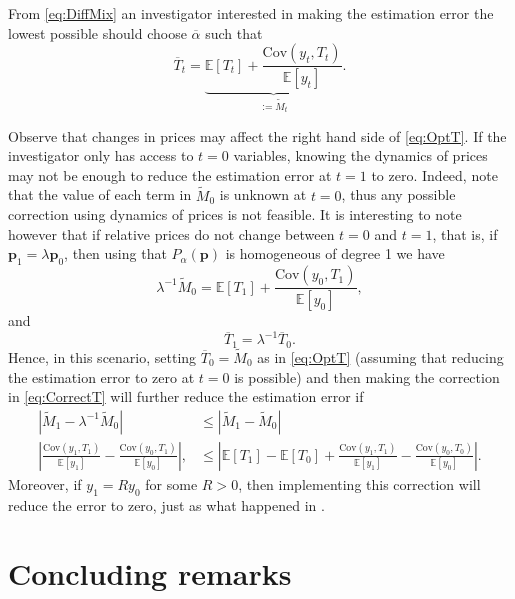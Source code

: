 \documentclass[english, a4paper,12pt]{article}
\begin{document}
From \eqref{eq:DiffMix} an investigator interested in making the estimation error the lowest possible should choose $\overline{\alpha}$ such that
	\begin{equation} \label{eq:OptT}
		\overline{T}_{t} =  \underbrace{\mathbb{E}\left[T_{t} \right] + \frac{\mathrm{Cov}\left(y_{t}, T_{t} \right)}{\mathbb{E}[y_{t}]}}_{:= \tilde{M}_{t}}.
	\end{equation}

Observe that changes in prices may affect the right hand side of \eqref{eq:OptT}. If the investigator only has access to $t =0$ variables, knowing the dynamics of prices may not be enough to reduce the estimation error at $t =1$ to zero. Indeed, note that the value of each term in $\tilde{M}_{0}$ is unknown at $t=0$, thus any possible correction using dynamics of prices is not feasible. It is interesting to note however that if relative prices do not change between $t=0$ and $t=1$, that is, if $\mathbf{p}_{1} = \lambda \mathbf{p}_{0}$, then using that $P_{\alpha}(\mathbf{p})$ is homogeneous of degree 1 we have
	$$\lambda^{-1}\tilde{M}_{0} = \mathbb{E}[T_{1}] + \frac{\mathrm{Cov}\left(y_{0}, T_{1} \right)}{\mathbb{E}[y_{0}]},$$
and
	\begin{equation} \label{eq:CorrectT}
		\overline{T}_{1} = \lambda^{-1}\overline{T}_{0}.
	\end{equation}
Hence, in this scenario, setting $\overline{T}_{0} = \tilde{M}_{0}$ as in \eqref{eq:OptT} (assuming that reducing the estimation error to zero at $t=0$ is possible) and then making the correction in \eqref{eq:CorrectT} will further reduce the estimation error if
	\begin{align*}
		\left|\tilde{M}_{1} - \lambda^{-1}\tilde{M}_{0} \right|
			&\leq \left|\tilde{M}_{1} - \tilde{M}_{0} \right|	\\
		\left| \frac{\mathrm{Cov}\left(y_{1}, T_{1} \right)}{\mathbb{E}[y_{1}]} - \frac{\mathrm{Cov}\left(y_{0}, T_{1} \right)}{\mathbb{E}[y_{0}]} \right|,
			&\leq \left| \mathbb{E}\left[T_{1} \right] - \mathbb{E}\left[T_{0} \right] + \frac{\mathrm{Cov}\left(y_{1}, T_{1} \right)}{\mathbb{E}[y_{1}]} - \frac{\mathrm{Cov}\left(y_{0}, T_{0} \right)}{\mathbb{E}[y_{0}]} \right|.
	\end{align*}
Moreover, if $y_{1} = Ry_{0}$ for some $R>0$, then implementing this correction will reduce the error to zero, just as what happened in .


\section{Concluding remarks} \label{sec:Conclusion}




\end{document}

